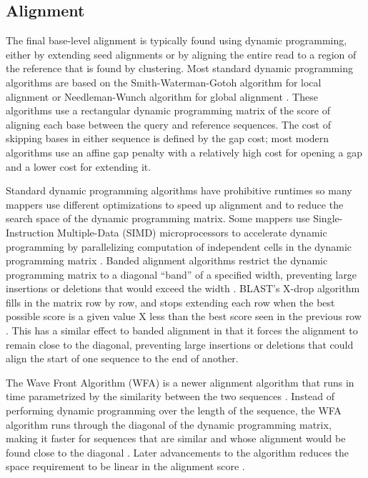 \documentclass[11pt]{ucscthesis}
\begin{document}
\subsection{Alignment}

The final base-level alignment is typically found using dynamic programming, either by extending seed alignments or by aligning the entire read to a region of the reference that is found by clustering.
Most standard dynamic programming algorithms are based on the Smith-Waterman-Gotoh algorithm for local alignment \cite{smith_waterman_1981,gotoh_1982} or Needleman-Wunch algorithm for global alignment \cite{needleman_wunsch_1970}.
These algorithms use a rectangular dynamic programming matrix of the score of aligning each base between the query and reference sequences.
The cost of skipping bases in either sequence is defined by the gap cost; most modern algorithms use an affine gap penalty with a relatively high cost for opening a gap and a lower cost for extending it.

Standard dynamic programming algorithms have prohibitive runtimes so many mappers use different optimizations to speed up alignment and to reduce the search space of the dynamic programming matrix.
Some mappers use Single-Instruction Multiple-Data (SIMD) microprocessors to accelerate dynamic programming by parallelizing computation of independent cells in the dynamic programming matrix \cite{farrar_striped_2007,rognes_six-fold_2000}.
Banded alignment algorithms restrict the dynamic programming matrix to a diagonal ``band'' of a specified width, preventing large insertions or deletions that would exceed the width \cite{chao_aligning_1992}.
BLAST's X-drop algorithm fills in the matrix row by row, and stops extending each row when the best possible score is a given value X less than the best score seen in the previous row \cite{altschul_blast_1990}.
This has a similar effect to banded alignment in that it forces the alignment to remain close to the diagonal, preventing large insertions or deletions that could align the start of one sequence to the end of another.

The Wave Front Algorithm (WFA) is a newer alignment algorithm that runs in time parametrized by the similarity between the two sequences \cite{marco-sola_fast_wfa_2021}.
Instead of performing dynamic programming over the length of the sequence, the WFA algorithm runs through the diagonal of the dynamic programming matrix, making it faster for sequences that are similar and whose alignment would be found close to the diagonal \cite{marco-sola_fast_wfa_2021}.
Later advancements to the algorithm reduces the space requirement to be linear in the alignment score \cite{eizenga_wfa_2022}.
\end{document}
